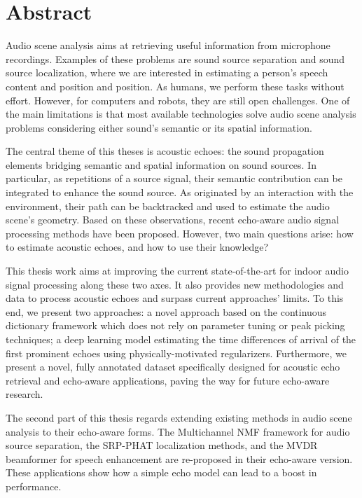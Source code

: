 \chapter*{Abstract}

{   \small

    Audio scene analysis aims at retrieving useful information from microphone recordings.
    Examples of these problems are sound source separation and sound source localization, where we are interested in estimating a person's speech content and position and position.
    As humans, we perform these tasks without effort. However, for computers and robots, they are still open challenges.
    One of the main limitations is that most available technologies solve audio scene analysis problems considering either sound's semantic or its spatial information.

    \mynewline
    The central theme of this theses is acoustic echoes: the sound propagation elements bridging semantic and spatial information on sound sources.
    In particular, as repetitions of a source signal, their semantic contribution can be integrated to enhance the sound source.
    As originated by an interaction with the environment, their path can be backtracked and used to estimate the audio scene's geometry.
    Based on these observations, recent echo-aware audio signal processing methods have been proposed.
    However, two main questions arise: how to estimate acoustic echoes, and how to use their knowledge?

    \mynewline
    This thesis work aims at improving the current state-of-the-art for indoor audio signal processing along these two axes.
    It also provides new methodologies and data to process acoustic echoes and surpass current approaches' limits.
    To this end, we present two approaches:
    a novel approach based on the  continuous dictionary framework which does not rely on parameter tuning or peak picking techniques;
    a deep learning model estimating the time differences of arrival of the first prominent echoes using physically-motivated regularizers.
    Furthermore, we present a novel, fully annotated dataset specifically designed for acoustic echo retrieval and echo-aware applications, paving the way for future echo-aware research.

    \mynewline
    The second part of this thesis regards extending existing methods in audio scene analysis to their echo-aware forms.
    The Multichannel NMF framework for audio source separation, the SRP-PHAT localization methods, and the MVDR beamformer for speech enhancement
    are re-proposed in their echo-aware version. These applications show how a simple echo model can lead to a boost in performance.

}
